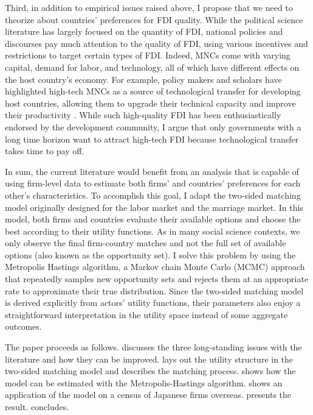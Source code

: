 Third, in addition to empirical issues raised above, I propose that we need to theorize about countries' preferences for FDI quality. While the political science literature has largely focused on the quantity of FDI, national policies and discourses pay much attention to the quality of FDI, using various incentives and restrictions to target certain types of FDI. Indeed, MNCs come with varying capital, demand for labor, and technology, all of which have different effects on the host country's economy. For example, policy makers and scholars have highlighted high-tech MNCs as a source of technological transfer for developing host countries, allowing them to upgrade their technical capacity and improve their productivity \citep{Findlay1978, Nunnenkamp2004}. While such high-quality FDI has been enthusiastically endorsed by the development community, I argue that only governments with a long time horizon want to attract high-tech FDI because technological transfer takes time to pay off.

In sum, the current literature would benefit from an analysis that is capable of using firm-level data to estimate both firms' and countries' preferences for each other's characteristics. To accomplish this goal, I adapt the two-sided matching model originally designed for the labor market and the marriage market. In this model, both firms and countries evaluate their available options and choose the best according to their utility functions. As in many social science contexts, we only observe the final firm-country matches and not the full set of available options (also known as the opportunity set). I solve this problem by using the Metropolis Hastings algorithm, a Markov chain Monte Carlo (MCMC) approach that repeatedly samples new opportunity sets and rejects them at an appropriate rate to approximate their true distribution. Since the two-sided matching model is derived explicitly from actors' utility functions, their parameters also enjoy a straightforward interpretation in the utility space instead of some aggregate outcomes.

The paper proceeds as follows.  discusses the three long-standing issues with the literature and how they can be improved.  lays out the utility structure in the two-sided matching model and describes the matching process.  shows how the model can be estimated with the Metropolis-Hastings algorithm.  shows an application of the model on a census of Japanese firms overseas.  presents the result.  concludes.